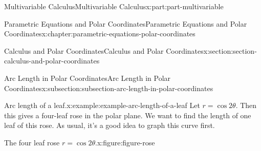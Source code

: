 \documentclass[twoside,10pt,]{book}
\numberwithin{equation}{part}
\begin{document}
\begin{partptx}{Multivariable Calculus}{}{Multivariable Calculus}{}{}{x:part:part-multivariable}
\begin{chapterptx}{Parametric Equations and Polar Coordinates}{}{Parametric Equations and Polar Coordinates}{}{}{x:chapter:parametric-equations-polar-coordinates}
\begin{sectionptx}{Calculus and Polar Coordinates}{}{Calculus and Polar Coordinates}{}{}{x:section:section-calculus-and-polar-coordinates}
\begin{subsectionptx}{Arc Length in Polar Coordinates}{}{Arc Length in Polar Coordinates}{}{}{x:subsection:subsection-arc-length-in-polar-coordinates}
\begin{example}{Arc length of a leaf.}{x:example:example-arc-length-of-a-leaf}
Let \(r = \cos2\theta\). Then this gives a four-leaf rose in the polar plane. We want to find the length of one leaf of this rose. As usual, it's a good idea to graph this curve first.%
\begin{figureptx}{The four leaf rose \(r=\cos2\theta\).}{x:figure:figure-rose}{}%
\begin{image}{0}{1}{0}%
\end{image}
\end{figureptx}
\end{example}
\end{subsectionptx}
\end{sectionptx}
\end{chapterptx}
\end{partptx}
\end{document}
